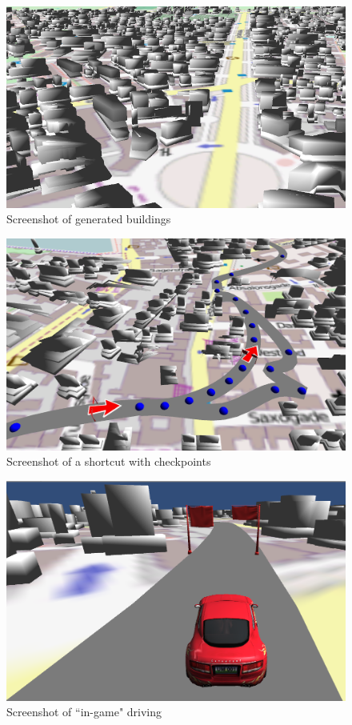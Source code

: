 \documentclass[conference]{IEEEtran}
\begin{document}
\begin{figure}[h!t]
\centering
\includegraphics[scale=0.45]{images/Buildings4.png}
\caption{\label{buildings} Screenshot of generated buildings}
\end{figure}

\begin{figure}[h!t]
\centering
\includegraphics[scale=0.3]{images/Checkpoints1.png}
\caption{\label{buildings} Screenshot of a shortcut with checkpoints}
\end{figure}

\begin{figure}[h!t]
\centering
\includegraphics[scale=0.3]{images/Car1.png}
\caption{\label{buildings} Screenshot of ``in-game" driving}
\end{figure}
\end{document}
